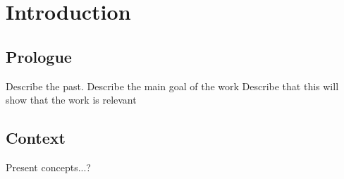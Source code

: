 \chapter{Introduction} %
\label{chapter:introduction}


\section{Prologue} %
\label{sec:prologue}

Describe the past.
Describe the main goal of the work
Describe that this will show that the work is relevant



\section{Context} %
\label{sec:context}

Present concepts...?

